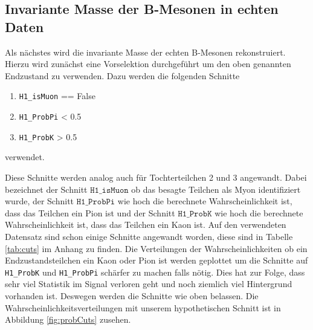 \subsection{Invariante Masse der B-Mesonen in echten Daten}
Als n\"achstes wird die invariante Masse der echten B-Mesonen rekonstruiert.
Hierzu wird zun\"achst eine Vorselektion durchgef\"uhrt um den oben genannten Endzustand zu verwenden.
Dazu werden die folgenden Schnitte
\begin{enumerate}
  \item \texttt{H1\_isMuon} == False
  \item \texttt{H1\_ProbPi} < 0.5
  \item \texttt{H1\_ProbK} > 0.5
\end{enumerate}
verwendet.

Diese Schnitte werden analog auch f\"ur Tochterteilchen 2 und 3 angewandt.
Dabei bezeichnet der Schnitt $\texttt{H1\_isMuon}$ ob das besagte Teilchen als Myon identifiziert wurde, der Schnitt $\texttt{H1\_ProbPi}$ wie hoch die berechnete Wahrscheinlichkeit ist, dass das Teilchen ein Pion ist und der Schnitt $\texttt{H1\_ProbK}$ wie hoch die berechnete Wahrscheinlichkeit ist, dass das Teilchen ein Kaon ist.
Auf den verwendeten Datensatz sind schon einige Schnitte angewandt worden, diese sind in Tabelle \ref{tab:cuts} im Anhang zu finden.
Die Verteilungen der Wahrscheinlichkeiten ob ein Endzustandsteilchen ein Kaon oder Pion ist werden geplottet um die Schnitte auf \texttt{H1\_ProbK} und \texttt{H1\_ProbPi} sch\"arfer zu machen falls nötig.
Dies hat zur Folge, dass sehr viel Statistik im Signal verloren geht und noch ziemlich viel Hintergrund vorhanden ist. Deswegen werden die Schnitte wie oben belassen.
Die Wahrscheinlichkeitsverteilungen mit unserem hypothetischen Schnitt ist in Abbildung \ref{fig:probCuts} zusehen.


